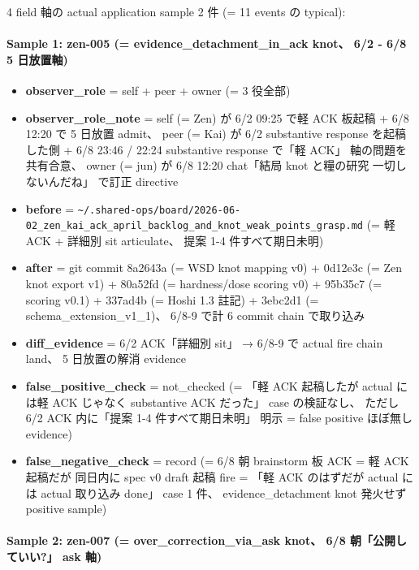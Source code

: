 \documentclass[
]{article}
\providecommand{\tightlist}{%
  \setlength{\itemsep}{0pt}\setlength{\parskip}{0pt}}
\begin{document}
4 field 軸の actual application sample 2 件 (= 11 events の typical):

\paragraph{Sample 1: zen-005 (= evidence\_detachment\_in\_ack knot、 6/2
- 6/8 5
日放置軸)}\label{sample-1-zen-005-evidence_detachment_in_ack-knot-62---68-5-ux65e5ux653eux7f6eux8ef8}

\begin{itemize}
\tightlist
\item
  \textbf{observer\_role} = self + peer + owner (= 3 役全部)
\item
  \textbf{observer\_role\_note} = self (= Zen) が 6/2 09:25 で軽 ACK
  板起稿 + 6/8 12:20 で 5 日放置 admit、 peer (= Kai) が 6/2 substantive
  response を起稿した側 + 6/8 23:46 / 22:24 substantive response で「軽
  ACK」 軸の問題を共有合意、 owner (= jun) が 6/8 12:20 chat「結局 knot
  と糧の研究 一切しないんだね」 で訂正 directive
\item
  \textbf{before} =
  \texttt{\textasciitilde{}/.shared-ops/board/2026-06-02\_zen\_kai\_ack\_april\_backlog\_and\_knot\_weak\_points\_grasp.md}
  (= 軽 ACK + 詳細別 sit articulate、 提案 1-4 件すべて期日未明)
\item
  \textbf{after} = git commit 8a2643a (= WSD knot mapping v0) + 0d12e3c
  (= Zen knot export v1) + 80a52fd (= hardness/dose scoring v0) +
  95b35c7 (= scoring v0.1) + 337ad4b (= Hoshi 1.3 註記) + 3ebc2d1 (=
  schema\_extension\_v1\_1)、 6/8-9 で計 6 commit chain で取り込み
\item
  \textbf{diff\_evidence} = 6/2 ACK「詳細別 sit」 → 6/8-9 で actual fire
  chain land、 5 日放置の解消 evidence
\item
  \textbf{false\_positive\_check} = not\_checked (= 「軽 ACK 起稿したが
  actual には軽 ACK じゃなく substantive ACK だった」 case の検証なし、
  ただし 6/2 ACK 内に「提案 1-4 件すべて期日未明」 明示 = false positive
  ほぼ無し evidence)
\item
  \textbf{false\_negative\_check} = record (= 6/8 朝 brainstorm 板 ACK =
  軽 ACK 起稿だが 同日内に spec v0 draft 起稿 fire = 「軽 ACK のはずだが
  actual には actual 取り込み done」 case 1 件、 evidence\_detachment
  knot 発火せず positive sample)
\end{itemize}

\paragraph{Sample 2: zen-007 (= over\_correction\_via\_ask knot、 6/8
朝「公開していい?」 ask
軸)}\label{sample-2-zen-007-over_correction_via_ask-knot-68-ux671dux516cux958bux3057ux3066ux3044ux3044-ask-ux8ef8}
\end{document}
